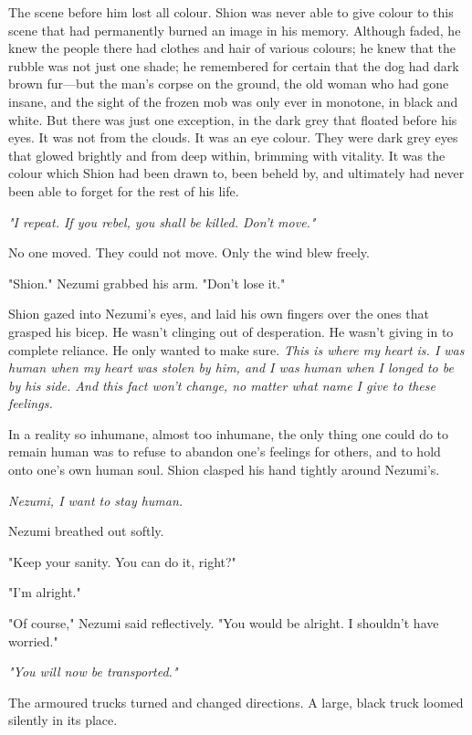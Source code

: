The scene before him lost all colour. Shion was never able to give
colour to this scene that had permanently burned an image in his memory.
Although faded, he knew the people there had clothes and hair of various
colours; he knew that the rubble was not just one shade; he remembered
for certain that the dog had dark brown fur---but the man's corpse on the
ground, the old woman who had gone insane, and the sight of the frozen
mob was only ever in monotone, in black and white. But there was just
one exception, in the dark grey that floated before his eyes. It was not
from the clouds. It was an eye colour. They were dark grey eyes that
glowed brightly and from deep within, brimming with vitality. It was the
colour which Shion had been drawn to, been beheld by, and ultimately had
never been able to forget for the rest of his life.

\emph{"I repeat. If you rebel, you shall be killed. Don't move."}

No one moved. They could not move. Only the wind blew freely.

"Shion." Nezumi grabbed his arm. "Don't lose it."

Shion gazed into Nezumi's eyes, and laid his own fingers over the ones
that grasped his bicep. He wasn't clinging out of desperation. He wasn't
giving in to complete reliance. He only wanted to make sure. \emph{This is
where my heart is. I was human when my heart was stolen by him, and I
was human when I longed to be by his side. And this fact won't change,
no matter what name I give to these feelings.}

In a reality so inhumane, almost too inhumane, the only thing one could
do to remain human was to refuse to abandon one's feelings for others,
and to hold onto one's own human soul. Shion clasped his hand tightly
around Nezumi's.

\emph{Nezumi, I want to stay human.}

Nezumi breathed out softly.

"Keep your sanity. You can do it, right?"

"I'm alright."

"Of course," Nezumi said reflectively. "You would be alright. I
shouldn't have worried."

\emph{"You will now be transported."}

The armoured trucks turned and changed directions. A large, black truck
loomed silently in its place.